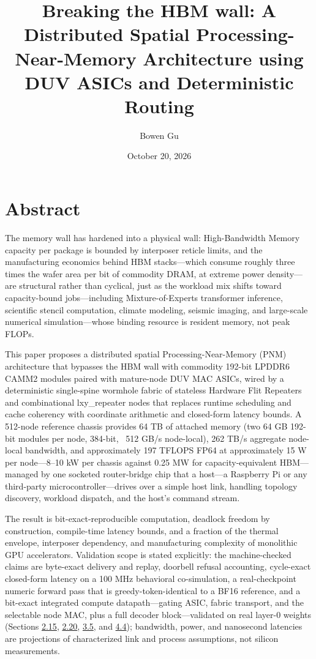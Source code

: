 \documentclass[10pt,twocolumn]{article}
\title{Breaking the HBM wall: A Distributed Spatial Processing-Near-Memory Architecture using DUV ASICs and Deterministic Routing}
\author{Bowen Gu}
\date{October 20, 2026}
\begin{document}
\maketitle
\thispagestyle{empty}

\section*{Abstract}\label{sec:abstract}

The memory wall has hardened into a physical wall: High-Bandwidth Memory capacity per package is bounded by interposer reticle limits\cite{15}, and the manufacturing economics behind HBM stacks---which consume roughly three times the wafer area per bit of commodity DRAM, at extreme power density---are structural rather than cyclical\cite{25}, just as the workload mix shifts toward capacity-bound jobs---including Mixture-of-Experts transformer inference, scientific stencil computation, climate modeling, seismic imaging, and large-scale numerical simulation---whose binding resource is resident memory, not peak FLOPs\cite{3,4,26}.

This paper proposes a distributed spatial Processing-Near-Memory (PNM) architecture that bypasses the HBM wall with commodity 192-bit LPDDR6 CAMM2 modules\cite{16,17} paired with mature-node DUV MAC ASICs, wired by a deterministic single-spine wormhole fabric of stateless Hardware Flit Repeaters and combinational lxy\_repeater nodes that replaces runtime scheduling and cache coherency with coordinate arithmetic and closed-form latency bounds\cite{13,14}. A 512-node reference chassis provides 64 TB of attached memory (two 64 GB 192-bit modules per node, 384-bit, ~512 GB/s node-local), 262 TB/s aggregate node-local bandwidth, and approximately 197 TFLOPS FP64 at approximately 15 W per node---8--10 kW per chassis against 0.25 MW for capacity-equivalent HBM---managed by one socketed router-bridge chip that a host---a Raspberry Pi or any third-party microcontroller---drives over a simple host link, handling topology discovery, workload dispatch, and the host's command stream\cite{5}.

The result is bit-exact-reproducible computation, deadlock freedom by construction, compile-time latency bounds, and a fraction of the thermal envelope, interposer dependency, and manufacturing complexity of monolithic GPU accelerators. Validation scope is stated explicitly: the machine-checked claims are byte-exact delivery and replay, doorbell refusal accounting, cycle-exact closed-form latency on a 100 MHz behavioral co-simulation, a real-checkpoint numeric forward pass that is greedy-token-identical to a BF16 reference, and a bit-exact integrated compute datapath---gating ASIC, fabric transport, and the selectable node MAC, plus a full decoder block---validated on real layer-0 weights (Sections \hyperref[sec:2.15]{2.15}, \hyperref[sec:2.20]{2.20}, \hyperref[sec:3.5]{3.5}, and \hyperref[sec:4.4]{4.4}); bandwidth, power, and nanosecond latencies are projections of characterized link and process assumptions, not silicon measurements.
\end{document}

